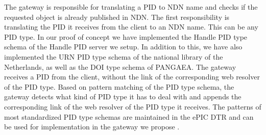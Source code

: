 The gateway is responsible for translating a PID to NDN name and checks if the requested object is already published in NDN. 
The first responsibility is translating the PID it receives from the client to an NDN name. This can be any PID type. In our proof of concept we have implemented the Handle PID type schema of the Handle PID server we setup. In addition to this, we have also implemented the URN PID type schema of the national library of the Netherlands, as well as the DOI type schema of PANGAEA. The gateway receives a PID from the client, without the link of the corresponding web resolver of the PID type. Based on pattern matching of the PID type schema, the gateway detects what kind of PID type it has to deal with and appends the corresponding link of the web resolver of the PID type it receives. 
The patterns of most standardized PID type schemas are maintained in the ePIC DTR and can be used for implementation in the gateway we propose \cite{dtr}. 


